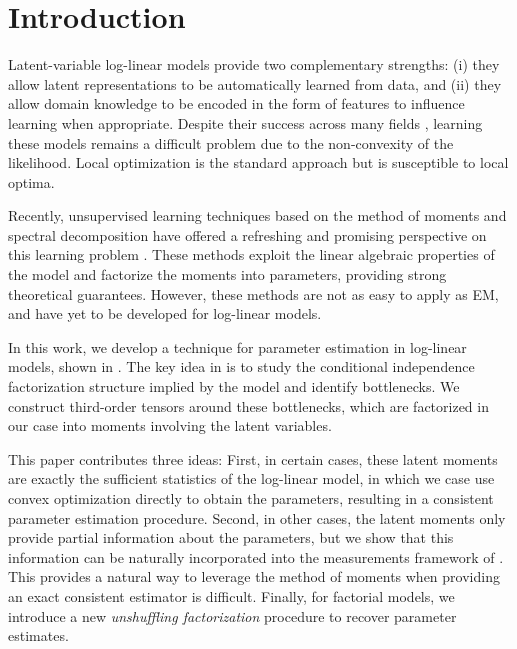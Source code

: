 \section{Introduction} \label{sec:introduction}

Latent-variable log-linear models provide two complementary strengths: (i) they allow
latent representations to be automatically learned from data, and (ii)
they allow domain knowledge to be encoded in the form of features to influence learning when appropriate.
Despite their success across many fields \cite{quattoni04crf,haghighi06prototype,liang06discrimative,kirkpatrick10painless,deselaers12latent},
learning these models remains a difficult problem due to the non-convexity of the likelihood.
Local optimization is the standard approach but is susceptible to local optima.

Recently, unsupervised learning techniques based on the method of moments and
spectral decomposition have offered a refreshing and promising perspective on
this learning problem \citep{hsu09spectral,anandkumar11tree,anandkumar12moments,anandkumar12lda,hsu12identifiability,balle11transducer,balle12automata}.
These methods exploit the linear algebraic properties of the model and
factorize the moments into parameters, providing strong theoretical guarantees.
However, these methods are not as easy to apply as EM, and have yet to be
developed for log-linear models.

In this work, we develop a technique for parameter estimation in log-linear
models, shown in .  The key idea in
\citet{anandkumar12moments,anandkumar13tensor} is to study the conditional
independence factorization structure implied by the model and identify
bottlenecks.  We construct third-order tensors around these bottlenecks, which
are factorized in our case into moments involving the latent variables.


This paper contributes three ideas:
First, in certain cases, these latent moments are exactly the sufficient statistics of
the log-linear model, in which we case use convex optimization directly to obtain the parameters,
resulting in a consistent parameter estimation procedure.
Second, in other cases, the latent moments only provide partial information about the parameters,
but we show that this information can be naturally incorporated into the measurements framework of \citet{liang09measurements}.
This provides a natural way to leverage the method of moments when providing an
exact consistent estimator is difficult.
Finally, for factorial models, we introduce a new \emph{unshuffling
factorization} procedure to recover parameter estimates.
